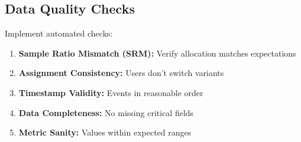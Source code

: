 \subsection{Data Quality Checks}

Implement automated checks:

\begin{enumerate}
    \item \textbf{Sample Ratio Mismatch (SRM):} Verify allocation matches expectations

    \item \textbf{Assignment Consistency:} Users don't switch variants

    \item \textbf{Timestamp Validity:} Events in reasonable order

    \item \textbf{Data Completeness:} No missing critical fields

    \item \textbf{Metric Sanity:} Values within expected ranges
\end{enumerate}

